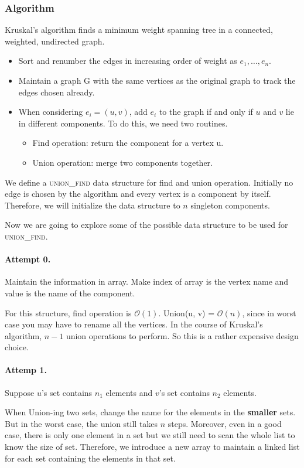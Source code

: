 \subsubsection{Algorithm}
Kruskal's algorithm finds a minimum weight spanning tree in a connected, weighted, undirected graph.
\begin{itemize}
	\item Sort and renumber the edges in increasing order of weight as $ e_1 , \dots, e_n $.
	\item Maintain a graph G with the same vertices as the original graph to track the edges chosen already.
	\item When considering $ e_i = (u, v) $, add $e_i$ to the graph if and only if $u$ and $v$ lie in different components. To do this, we need two routines.
	\begin{itemize}
		\item Find operation: return the component for a vertex u.
		\item Union operation: merge two components together.
	\end{itemize}
\end{itemize}
We define a \textsc{union\_find} data structure for find and union operation. Initially no edge is chosen by the algorithm and every vertex is a component by itself. Therefore, we will initialize the data structure to $n$ singleton components.

Now we are going to explore some of the possible data structure to be used for \textsc{union\_find}.

\paragraph{Attempt 0.} Maintain the information in array. Make index of array is the vertex name and value is the name of the component.

For this structure, find operation is $\mathcal{O}(1)$. Union(u, v) = $\mathcal{O}(n) $, since in worst case you may have to rename all the vertices. In the course of Kruskal's algorithm, $n-1$ union operations to perform. So this is a rather expensive design choice.

\paragraph{Attemp 1.} Suppose $u$'s set contains $n_1$ elements and $v$'s set contains $n_2$ elements. 

When Union-ing two sets, change the name for the elements in the \textbf{smaller} sets. But in the worst case, the union still takes $n$ steps. Moreover, even in a good case, there is only one element in a set but we still need to scan the whole list to know the size of set. Therefore, we introduce a new array to maintain a linked list for each set containing the elements in that set.

